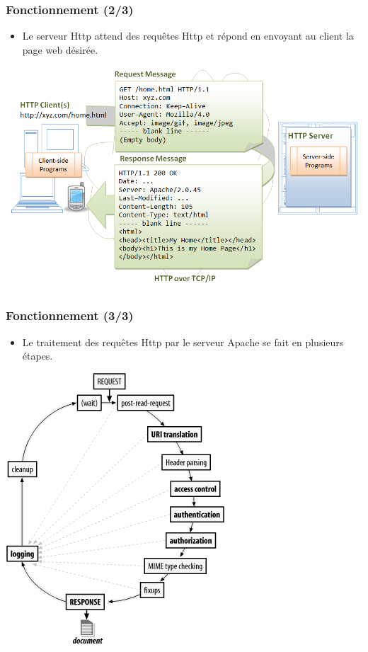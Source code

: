 \begin{frame}
	\frametitle{Fonctionnement (2/3)}
	\begin{itemize}
		\item Le serveur Http attend des requêtes Http et répond en envoyant au client la page web désirée.
	\end{itemize}
	\begin{center}
		\includegraphics[scale=0.3]{Images/protocole_http.png}
	\end{center}
\end{frame}

\begin{frame}
	\frametitle{Fonctionnement (3/3)}
	\begin{itemize}
		\item Le traitement des requêtes Http par le serveur Apache se fait en plusieurs étapes.
	\end{itemize}
	\begin{center}
		\includegraphics[scale=0.4]{Images/processing_apache.png}
	\end{center}
\end{frame}

